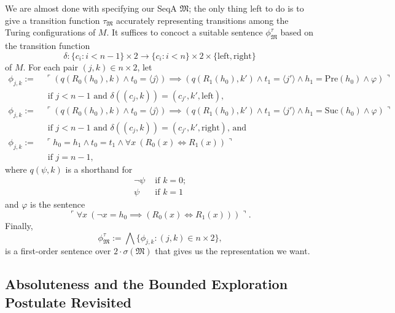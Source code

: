 \documentclass[12pt]{article}
\numberwithin{equation}{section}
\begin{document}
\begin{ex}
We are almost done with specifying our SeqA $\mathfrak{M}$; the only thing left to do is to give a transition function $\tau_{\mathfrak{M}}$ accurately representing transitions among the Turing configurations of $M$. It suffices to concoct a suitable sentence $\phi^{\tau}_{\mathfrak{M}}$ based on the transition function $$\delta : \{c_i : i < n-1\} \times 2 \longrightarrow \{c_i : i < n\} \times 2 \times \{\mathrm{left}, \mathrm{right}\}$$ of $M$. For each pair $(j, k) \in n \times 2$, let
\begin{align*}
    \phi_{j,k} := \ & \ulcorner (q(R_0(h_0), k) \wedge t_0 \! = \! \langle j \rangle) \!\! \implies \!\! (q(R_1(h_0), k') \wedge t_1 \! = \! \langle j' \rangle \wedge h_1 \! = \mathrm{Pre}(h_0) \wedge \varphi) \urcorner \\ 
    & \text{ if } j < n-1 \text{ and } \delta((c_j, k)) = (c_{j'}, k', \mathrm{left}) \text{,} \\
    \phi_{j,k} := \ & \ulcorner (q(R_0(h_0), k) \wedge t_0 \! = \! \langle j \rangle) \!\! \implies \!\! (q(R_1(h_0), k') \wedge t_1 \! = \! \langle j' \rangle \wedge h_1 \! = \mathrm{Suc}(h_0) \wedge \varphi) \urcorner \\ 
    & \text{ if } j < n-1 \text{ and } \delta((c_j, k)) = (c_{j'}, k', \mathrm{right}) \text{, and} \\
    \phi_{j,k} := \ & \ulcorner h_0 = h_1 \wedge t_0 = t_1 \wedge \forall x \ (R_0(x) \iff R_1(x)) \urcorner \\ 
    & \text{ if } j = n-1 \text{,}
\end{align*}
where $q(\psi, k)$ is a shorthand for 
\begin{align*}
    \neg \psi & \text{ if } k = 0 \text{;} \\
    \psi & \text{ if } k = 1
\end{align*}
and $\varphi$ is the sentence
\begin{equation*}
    \ulcorner \forall x \ (\neg x = h_0 \implies (R_0(x) \iff R_1(x))) \urcorner \text{.}
\end{equation*}
Finally, 
\begin{equation*}
    \phi^{\tau}_{\mathfrak{M}} := \bigwedge \{\phi_{j,k} : (j, k) \in n \times 2\} \text{,}
\end{equation*}
is a first-order sentence over $2 \cdot \sigma(\mathfrak{M})$ that gives us the representation we want.
\end{ex}

\subsection{Absoluteness and the Bounded Exploration Postulate Revisited}\label{ss240}
\end{document}
